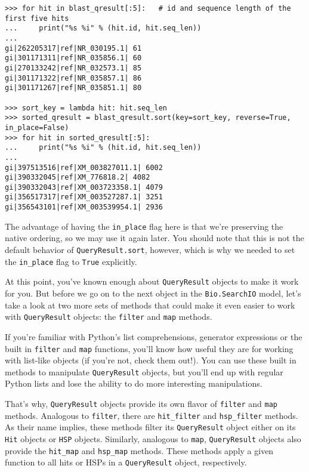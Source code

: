 \documentclass{report}
\begin{document}
\begin{verbatim}
>>> for hit in blast_qresult[:5]:   # id and sequence length of the first five hits
...     print("%s %i" % (hit.id, hit.seq_len))
... 
gi|262205317|ref|NR_030195.1| 61
gi|301171311|ref|NR_035856.1| 60
gi|270133242|ref|NR_032573.1| 85
gi|301171322|ref|NR_035857.1| 86
gi|301171267|ref|NR_035851.1| 80

>>> sort_key = lambda hit: hit.seq_len
>>> sorted_qresult = blast_qresult.sort(key=sort_key, reverse=True, in_place=False)
>>> for hit in sorted_qresult[:5]:
...     print("%s %i" % (hit.id, hit.seq_len))
... 
gi|397513516|ref|XM_003827011.1| 6002
gi|390332045|ref|XM_776818.2| 4082
gi|390332043|ref|XM_003723358.1| 4079
gi|356517317|ref|XM_003527287.1| 3251
gi|356543101|ref|XM_003539954.1| 2936
\end{verbatim}

The advantage of having the \verb|in_place| flag here is that we're preserving
the native ordering, so we may use it again later. You should note that this is
not the default behavior of \verb|QueryResult.sort|, however, which is why we
needed to set the \verb|in_place| flag to \verb|True| explicitly.

At this point, you've known enough about \verb|QueryResult| objects to make it
work for you. But before we go on to the next object in the \verb|Bio.SearchIO|
model, let's take a look at two more sets of methods that could make it even
easier to work with \verb|QueryResult| objects: the \verb|filter| and \verb|map|
methods.

If you're familiar with Python's list comprehensions, generator expressions
or the built in \verb|filter| and \verb|map| functions,
you'll know how useful they are for working with list-like objects (if you're
not, check them out!). You can use these built in methods to manipulate
\verb|QueryResult| objects, but you'll end up with regular Python lists and lose
the ability to do more interesting manipulations.

That's why, \verb|QueryResult| objects provide its own flavor of
\verb|filter| and \verb|map| methods. Analogous to \verb|filter|, there are
\verb|hit_filter| and \verb|hsp_filter| methods. As their name implies, these
methods filter its \verb|QueryResult| object either on its \verb|Hit| objects
or \verb|HSP| objects. Similarly, analogous to \verb|map|, \verb|QueryResult|
objects also provide the \verb|hit_map| and \verb|hsp_map| methods. These
methods apply a given function to all hits or HSPs in a \verb|QueryResult|
object, respectively.
\end{document}
